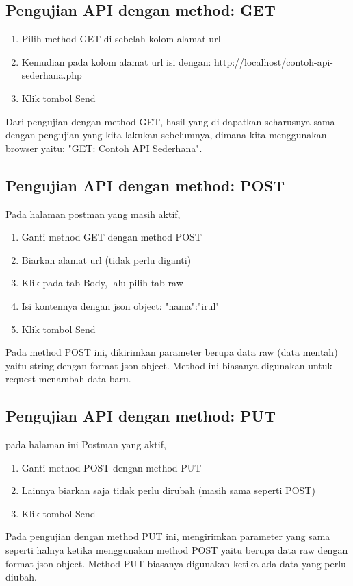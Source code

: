 \subsection{Pengujian API dengan method: GET}
\begin{enumerate}
\item Pilih method GET di sebelah kolom alamat url
\item Kemudian pada kolom alamat url isi dengan: http://localhost/contoh-api-sederhana.php
\item Klik tombol Send
\end{enumerate}
Dari pengujian dengan method GET, hasil yang di dapatkan seharusnya sama dengan pengujian yang kita lakukan sebelumnya, dimana kita menggunakan browser yaitu: "GET: Contoh API Sederhana".

\subsection{Pengujian API dengan method: POST}
Pada halaman postman yang masih aktif,
\begin{enumerate}
\item Ganti method GET dengan method POST
\item Biarkan alamat url (tidak perlu diganti)
\item Klik pada tab Body, lalu pilih tab raw
\item Isi kontennya dengan json object: {"nama":"irul"}
\item Klik tombol Send
\end{enumerate}
Pada method POST ini, dikirimkan  parameter berupa data raw (data mentah) yaitu string dengan format json object. Method ini biasanya digunakan untuk request menambah data baru. 


\subsection{Pengujian API dengan method: PUT}
pada halaman ini Postman yang aktif,
\begin{enumerate}
\item Ganti method POST dengan method PUT
\item Lainnya biarkan saja tidak perlu dirubah (masih sama seperti POST)
\item Klik tombol Send
\end{enumerate}
Pada pengujian dengan method PUT ini, mengirimkan parameter yang sama seperti halnya ketika menggunakan method POST yaitu berupa data raw dengan format json object. Method PUT biasanya digunakan ketika ada data yang perlu diubah. 

